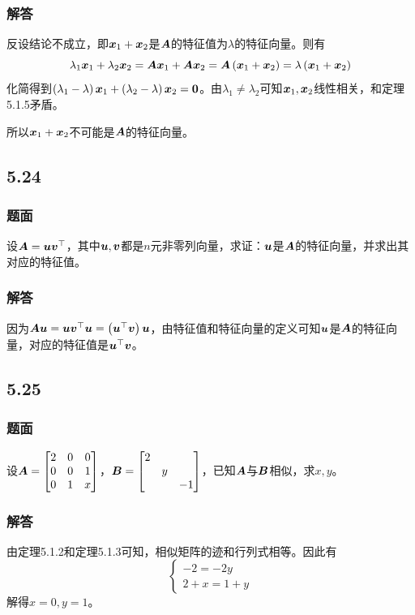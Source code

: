 \documentclass{beamer}
\begin{document}
\begin{frame}
    \frametitle{解答}
    反设结论不成立，即\(\boldsymbol{x}_1+\boldsymbol{x}_2\)是\(\boldsymbol{A}\)的特征值为\(\lambda\)的特征向量。则有
    \begin{equation*}
        \lambda_1\boldsymbol{x}_1+\lambda_2\boldsymbol{x}_2=\boldsymbol{A}\boldsymbol{x}_1+\boldsymbol{A}\boldsymbol{x}_2=\boldsymbol{A}\left( \boldsymbol{x}_1+\boldsymbol{x}_2 \right)=\lambda\left( \boldsymbol{x}_1+\boldsymbol{x}_2 \right)
    \end{equation*}
    \pause
    化简得到\(\left( \lambda_1-\lambda \right)\boldsymbol{x}_1+\left( \lambda_2-\lambda \right)\boldsymbol{x}_2=\boldsymbol{0}\)。由\(\lambda_1\neq\lambda_2\)可知\(\boldsymbol{x}_1,\boldsymbol{x}_2\)线性相关，和定理5.1.5矛盾。

    所以\(\boldsymbol{x}_1+\boldsymbol{x}_2\)不可能是\(\boldsymbol{A}\)的特征向量。
\end{frame}

\subsection*{5.24}
\begin{frame}
    \frametitle{题面}
    设\(\boldsymbol{A}=\boldsymbol{u}\boldsymbol{v}^\top\)，其中\(\boldsymbol{u},\boldsymbol{v}\)都是\(n\)元非零列向量，求证：\(\boldsymbol{u}\)是\(\boldsymbol{A}\)的特征向量，并求出其对应的特征值。
\end{frame}

\begin{frame}
    \frametitle{解答}
    因为\(\boldsymbol{A}\boldsymbol{u}=\boldsymbol{u}\boldsymbol{v}^\top\boldsymbol{u}=\left( \boldsymbol{u}^\top\boldsymbol{v} \right)\boldsymbol{u}\)，由特征值和特征向量的定义可知\(\boldsymbol{u}\)是\(\boldsymbol{A}\)的特征向量，对应的特征值是\(\boldsymbol{u}^\top\boldsymbol{v}\)。
\end{frame}

\subsection*{5.25}
\begin{frame}
    \frametitle{题面}
    设\(\boldsymbol{A}=\begin{bmatrix}2&0&0\\0&0&1\\0&1&x\end{bmatrix}\)，\(\boldsymbol{B}=\begin{bmatrix}2&&\\&y&\\&&-1\end{bmatrix}\)，已知\(\boldsymbol{A}\)与\(\boldsymbol{B}\)相似，求\(x,y\)。
\end{frame}

\begin{frame}
    \frametitle{解答}
    由定理5.1.2和定理5.1.3可知，相似矩阵的迹和行列式相等。因此有
    \begin{equation*}
        \begin{cases}
            -2=-2y \\
            2+x=1+y
        \end{cases}
    \end{equation*}
    解得\(x=0,y=1\)。
\end{frame}
\end{document}
